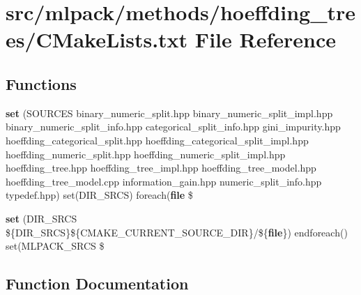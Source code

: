 \section{src/mlpack/methods/hoeffding\+\_\+trees/\+C\+Make\+Lists.txt File Reference}
\label{methods_2hoeffding__trees_2CMakeLists_8txt}
\subsection*{Functions}
\begin{DoxyCompactItemize}
\item 
{\bf set} (S\+O\+U\+R\+C\+ES binary\+\_\+numeric\+\_\+split.\+hpp binary\+\_\+numeric\+\_\+split\+\_\+impl.\+hpp binary\+\_\+numeric\+\_\+split\+\_\+info.\+hpp categorical\+\_\+split\+\_\+info.\+hpp gini\+\_\+impurity.\+hpp hoeffding\+\_\+categorical\+\_\+split.\+hpp hoeffding\+\_\+categorical\+\_\+split\+\_\+impl.\+hpp hoeffding\+\_\+numeric\+\_\+split.\+hpp hoeffding\+\_\+numeric\+\_\+split\+\_\+impl.\+hpp hoeffding\+\_\+tree.\+hpp hoeffding\+\_\+tree\+\_\+impl.\+hpp hoeffding\+\_\+tree\+\_\+model.\+hpp hoeffding\+\_\+tree\+\_\+model.\+cpp information\+\_\+gain.\+hpp numeric\+\_\+split\+\_\+info.\+hpp typedef.\+hpp) set(D\+I\+R\+\_\+\+S\+R\+CS) foreach({\bf file} \$
\item 
{\bf set} (D\+I\+R\+\_\+\+S\+R\+CS \$\{D\+I\+R\+\_\+\+S\+R\+CS\}\$\{C\+M\+A\+K\+E\+\_\+\+C\+U\+R\+R\+E\+N\+T\+\_\+\+S\+O\+U\+R\+C\+E\+\_\+\+D\+IR\}/\$\{{\bf file}\}) endforeach() set(M\+L\+P\+A\+C\+K\+\_\+\+S\+R\+CS \$
\end{DoxyCompactItemize}


\subsection{Function Documentation}
